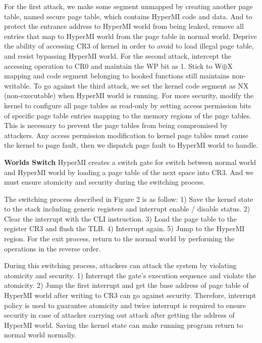 \documentclass[conference]{IEEEtran}
\begin{document}
For the first attack, we make some segment unmapped by creating another page table, named secure page table, which contains HyperMI code and data. And to protect the entrance address to HyperMI world from being leaked,
remove all entries that map to HyperMI world from the page table in normal world. Deprive the ability of accessing CR3 of kernel in order to avoid to load illegal page table, and resist bypassing HyperMI world.
For the second attack, intercept the accessing operation to CR0 and maintain the WP bit as 1. Stick to W$\oplus${X} mapping and code segment belonging to hooked functions still maintains non-writable.
To go against the third attack, we set the kernel code segment as NX (non-executable) when HyperMI world is running. For more security, modify the kernel to configure all page tables as read-only by setting access permission bits of specific page table entries mapping to the memory regions of the page tables. This is necessary to prevent the page tables from being compromised by attackers. Any access permission modification to kernel page tables must cause the kernel to page fault, then we dispatch page fault to HyperMI world to handle.

\textbf{Worlds Switch}
HyperMI creates a switch gate for switch between normal world and HyperMI world by loading a page table of the next space into CR3. And we must ensure atomicity and security during the switching process.

The switching process described in Figure 2 is as follow: 1) Save the kernel state to the stack including generic registers and interrupt enable / disable status. 2) Clear the interrupt with the CLI instruction. 3) Load the page table to the register CR3 and flush the TLB. 4) Interrupt again. 5) Jump to the HyperMI region. For the exit process, return to the normal world by performing the operations in the reverse order.

During this switching process, attackers can attack the system by violating atomicity and security. 1) Interrupt the gate's execution sequence and violate the atomicity. 2) Jump the first interrupt and get the base address of page table of HyperMI world after writing to CR3 can go against security. Therefore, interrupt policy is used to guarantee atomicity and twice interrupt is required to ensure security in case of attacker carrying out attack after getting the address of HyperMI world. Saving the kernel state can make running program return to normal world normally. 
\end{document}
